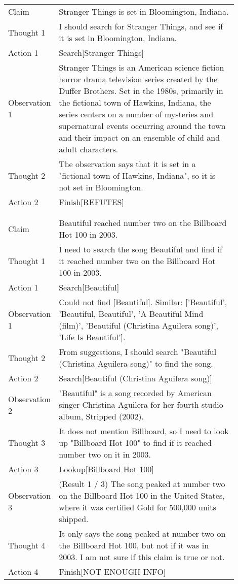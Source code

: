 \begin{table}[H]
\begin{minipage}{0.9\linewidth}
\begin{tabular}{l p{0.9\linewidth}}
Claim &  Stranger Things is set in Bloomington, Indiana.\\
Thought 1 & I should search for Stranger Things, and see if it is set in Bloomington, Indiana.\\
Action 1 & Search[Stranger Things]\\
Observation 1 &  Stranger Things is an American science fiction horror drama television series created by the Duffer Brothers. Set in the 1980s, primarily in the fictional town of Hawkins, Indiana, the series centers on a number of mysteries and supernatural events occurring around the town and their impact on an ensemble of child and adult characters. \\
Thought 2 & The observation says that it is set in a "fictional town of Hawkins, Indiana", so it is not set in Bloomington.\\
Action 2 & Finish[REFUTES]\\
\\
\\
Claim &  Beautiful reached number two on the Billboard Hot 100 in 2003.\\
Thought 1 & I need to search the song Beautiful and find if it reached number two on the Billboard Hot 100 in 2003.\\
Action 1 & Search[Beautiful]\\
Observation 1 &  Could not find [Beautiful]. Similar:  ['Beautiful', 'Beautiful, Beautiful', 'A Beautiful Mind (film)', 'Beautiful (Christina Aguilera song)', 'Life Is Beautiful'].\\
Thought 2 & From suggestions, I should search "Beautiful (Christina Aguilera song)" to find the song.\\
Action 2 & Search[Beautiful (Christina Aguilera song)]\\
Observation 2 &  "Beautiful" is a song recorded by American singer Christina Aguilera for her fourth studio album, Stripped (2002).\\
Thought 3 & It does not mention Billboard, so I need to look up "Billboard Hot 100" to find if it reached number two on it in 2003.\\
Action 3 & Lookup[Billboard Hot 100]\\
Observation 3 &  (Result 1 / 3) The song peaked at number two on the Billboard Hot 100 in the United States, where it was certified Gold for 500,000 units shipped.\\
Thought 4 & It only says the song peaked at number two on the Billboard Hot 100, but not if it was in 2003. I am not sure if this claim is true or not.\\
Action 4 & Finish[NOT ENOUGH INFO]\\


\bottomrule
\end{tabular}
\end{minipage}%
\end{table}